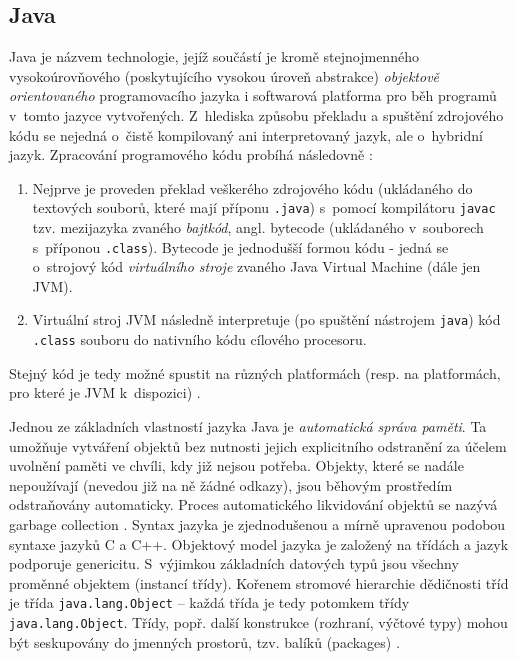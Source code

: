 \documentclass{bakalarka}
\begin{document}
\subsection{Java}
Java je názvem technologie, jejíž součástí je kromě stejnojmenného vysokoúrovňového (poskytujícího vysokou úroveň abstrakce) \textit{objektově orientovaného} programovacího jazyka i softwarová platforma pro běh programů v~tomto jazyce vytvořených. Z~hlediska způsobu překladu a spuštění zdrojového kódu se nejedná o~čistě kompilovaný ani interpretovaný jazyk, ale o~hybridní jazyk. Zpracování programového kódu probíhá následovně \cite{java-book, java-guide-vm, java-guide-javac, java-guide-java}:
\begin{enumerate}
\item Nejprve je proveden překlad veškerého zdrojového kódu (ukládaného do textových souborů, které mají příponu \texttt{.java}) s~pomocí kompilátoru \texttt{javac} tzv. mezijazyka zvaného \textit{bajtkód}, angl. bytecode (ukládaného v~souborech s~příponou \texttt{.class}). Bytecode je jednodušší formou kódu - jedná se o~strojový kód \textit{virtuálního stroje} zvaného Java Virtual Machine (dále jen JVM). 
\item Virtuální stroj JVM následně interpretuje (po spuštění nástrojem \texttt{java}) kód \texttt{.class} souboru do nativního kódu cílového procesoru. 
\end{enumerate}
Stejný kód je tedy možné spustit na různých platformách (resp. na platformách, pro které je JVM k~dispozici) \cite{java-book}.\par
Jednou ze základních vlastností jazyka Java je \textit{automatická správa paměti}. Ta umožňuje vytváření objektů bez nutnosti jejich explicitního odstranění za účelem uvolnění paměti ve chvíli, kdy již nejsou potřeba. Objekty, které se nadále nepoužívají (nevedou již na ně žádné odkazy), jsou běhovým prostředím odstraňovány automaticky. Proces automatického likvidování objektů se nazývá garbage collection \cite{java-book, java-guide-vm}.
Syntax jazyka je zjednodušenou a mírně upravenou podobou syntaxe jazyků C a C++. Objektový model jazyka je založený na třídách a jazyk podporuje genericitu. S~výjimkou základních datových typů jsou všechny proměnné objektem (instancí třídy). Kořenem stromové hierarchie dědičnosti tříd je třída \texttt{java.lang.Object} – každá třída je tedy potomkem třídy \texttt{java.lang.Object}. Třídy, popř. další konstrukce (rozhraní, výčtové typy) mohou být seskupovány do jmenných prostorů, tzv. balíků (packages) \cite{java-book, java-guide-object}.\par
\end{document}
